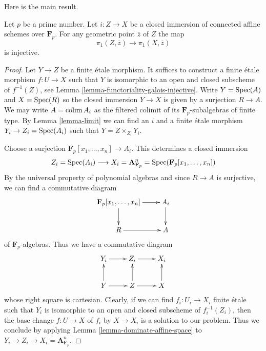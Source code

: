 \noindent
Here is the main result.

\begin{proposition}
\label{proposition-injective}
Let $p$ be a prime number. Let $i : Z \to X$ be a closed immersion
of connected affine schemes over $\mathbf{F}_p$. For any geometric
point $\overline{z}$ of $Z$ the map
$$
\pi_1(Z, \overline{z}) \to \pi_1(X, \overline{z})
$$
is injective.
\end{proposition}

\begin{proof}
Let $Y \to Z$ be a finite \'etale morphism. It suffices to construct
a finite \'etale morphism $f : U \to X$ such that $Y$ is isomorphic to
an open and closed subscheme of $f^{-1}(Z)$, see
Lemma \ref{lemma-functoriality-galois-injective}.
Write $Y = \mathop{\mathrm{Spec}}(A)$ and $X = \mathop{\mathrm{Spec}}(R)$ so the closed immersion
$Y \to X$ is given by a surjection $R \to A$. We may write
$A = \mathop{\mathrm{colim}}\nolimits A_i$ as the filtered colimit of its $\mathbf{F}_p$-subalgebras
of finite type. By Lemma \ref{lemma-limit}
we can find an $i$ and a finite \'etale morphism $Y_i \to Z_i = \mathop{\mathrm{Spec}}(A_i)$
such that $Y = Z \times_{Z_i} Y_i$.

\medskip\noindent
Choose a surjection $\mathbf{F}_p[x_1, \ldots, x_n] \to A_i$.
This determines a closed immersion
$$
Z_i = \mathop{\mathrm{Spec}}(A_i)
\longrightarrow
X_i = \mathbf{A}^n_{\mathbf{F}_p} = \mathop{\mathrm{Spec}}(\mathbf{F}_p[x_1, \ldots, x_n])
$$
By the universal property of polynomial algebras and since
$R \to A$ is surjective, we can find a commutative diagram
$$
\xymatrix{
\mathbf{F}_p[x_1, \ldots, x_n] \ar[r] \ar[d] &
A_i \ar[d] \\
R \ar[r] &
A
}
$$
of $\mathbf{F}_p$-algebras. Thus we have a commutative diagram
$$
\xymatrix{
Y_i \ar[r] &
Z_i \ar[r] &
X_i \\
Y \ar[u] \ar[r] &
Z \ar[u] \ar[r] &
X \ar[u]
}
$$
whose right square is cartesian. Clearly, if we can
find $f_i : U_i \to X_i$ finite \'etale such that $Y_i$ is
isomorphic to an open and closed subscheme of $f_i^{-1}(Z_i)$,
then the base change $f : U \to X$ of $f_i$ by $X \to X_i$
is a solution to our problem. Thus we conclude by applying
Lemma \ref{lemma-dominate-affine-space} to
$Y_i \to Z_i \to X_i = \mathbf{A}^n_{\mathbf{F}_p}$.
\end{proof}

















